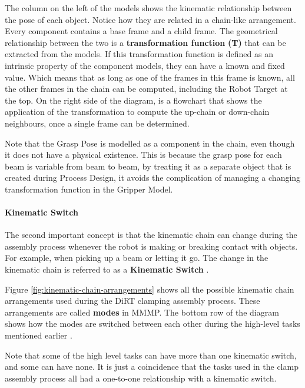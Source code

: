 The column on the left of the models shows the kinematic relationship between the pose of each object. Notice how they are related in a chain-like arrangement. Every component contains a base frame and a child frame. The geometrical relationship between the two is a \textbf{transformation function} \textbf{(T) }that can be extracted from the models. If this transformation function is defined as an intrinsic property of the component models, they can have a known and fixed value. Which means that as long as one of the frames in this frame is known, all the other frames in the chain can be computed, including the Robot Target at the top. On the right side of the diagram, is a flowchart that shows the application of the transformation to compute the up-chain or down-chain neighbours, once a single frame can be determined.

Note that the Grasp Pose is modelled as a component in the chain, even though it does not have a physical existence. This is because the grasp pose for each beam is variable from beam to beam, by treating it as a separate object that is created during Process Design, it avoids the complication of managing a changing transformation function in the Gripper Model.

\paragraph{Kinematic Switch}

The second important concept is that the kinematic chain can change during the assembly process whenever the robot is making or breaking contact with objects. For example, when picking up a beam or letting it go. The change in the kinematic chain is referred to as a \textbf{Kinematic Switch} \parencite{garrettIntegratedTaskMotion2021}.

Figure \ref{fig:kinematic-chain-arrangements} shows all the possible kinematic chain arrangements used during the DiRT clamping assembly process. These arrangements are called \textbf{modes }in MMMP. The bottom row of the diagram shows how the modes are switched between each other during the high-level tasks mentioned earlier .

Note that some of the high level tasks can have more than one kinematic switch, and some can have none. It is just a coincidence that the tasks used in the clamp assembly process all had a one-to-one relationship with a kinematic switch.

